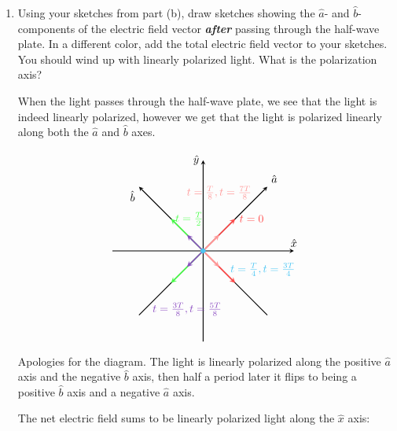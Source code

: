 \documentclass{article}
\begin{document}
\begin{enumerate}[resume, label = \alph*)]
    \item Using your sketches from part (b), draw sketches showing the $\hat a$- and $\hat b$- components of the electric field vector \textbf{\textit{after}} passing through the half-wave plate. In a different color, add the total electric field vector to your sketches. You should wind up with linearly polarized light. What is the polarization axis?
    
    \begin{solution}
    When the light passes through the half-wave plate, we see that the light is indeed linearly polarized, however we get that the light is polarized linearly along both the $\hat a$ and $\hat b$ axes. 

    $$\begin{tikzpicture}[scale=1.45]
        \draw[thick, -stealth] (0,-2) -- (0,2) node[anchor=east] {$\hat{y}$};
        \draw[thick, -stealth] (-2,0) -- (2,0) node[anchor=south] {$\hat{x}$};
        \draw[thick,-stealth] (-1.414,-1.414) -- (1.414,1.414) node[anchor=south west] {$\hat{a}$};
        \draw[thick,-stealth] (1.414,-1.414) -- (-1.414,1.414) node[anchor=north east] {$\hat{b}$};
        \draw[very thick, -stealth, red!70] (0,0) -- (0.707,0.707) node[anchor=west] {$t = 0$};
        \draw[very thick, -stealth, red!70] (0,0) -- (0.707,-0.707);
        \draw[very thick, -stealth, red!40!white] (0,0) -- (0.353,0.353) node[anchor=south, yshift=1cm] {$t = \frac{T}{8}, t = \frac{7T}{8}$};
        \draw[very thick, -stealth, red!40!white] (0,0) -- (0.353,-0.353);
        \draw[very thick, -stealth, green!70] (0,0) -- (-0.707,0.707) node[anchor=west] {$t = \frac{T}{2}$};
        \draw[very thick, -stealth, green!70] (0,0) -- (-0.707,-0.707);
        \draw[very thick, -stealth, violet!70!blue!70] (0,0) -- (-0.353,-0.353) node[anchor=north, yshift=-1cm] {$t = \frac{3T}{8}, t= \frac{5T}{8}$};
        \draw[very thick, -stealth, violet!70!blue!70] (0,0) -- (-0.353,0.353);
        \filldraw[cyan!70] (0,0) circle (0.05cm) node[anchor=north west, xshift=0.75cm,yshift=-0.25cm] {$t = \frac{T}{4}, t = \frac{3T}{4}$};
    \end{tikzpicture}$$

    Apologies for the diagram. The light is linearly polarized along the positive $\hat a$ axis and the negative $\hat b$ axis, then half a period later it flips to being a positive $\hat b$ axis and a negative $\hat a$ axis. 

    The net electric field sums to be linearly polarized light along the $\hat x$ axis:


\end{solution}
\end{enumerate}
\end{document}
